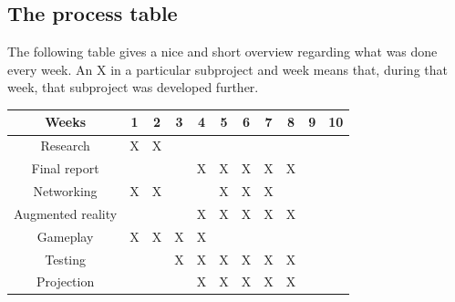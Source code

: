       
      \subsection{The process table} \label{ssec:processtable}
      The following table gives a nice and short overview regarding what was done
      every week. An X in a particular subproject and week means that, during that
      week, that subproject was developed further.\\
      \begin{table}[!ht]
	      \begin{tabular}{| c | c | c | c | c | c | c | c | c | c | c |}
	      	      \hline
	      	      Weeks & 1 & 2 & 3 & 4 & 5 & 6 & 7 & 8 & 9 & 10 \\
	      	      \hline
	      	      Research & X & X & \space & \space & \space & \space & \space & \space & \space & \space \\
	      	      \hline
	      	      Final report & \space & \space & \space & X & X & X & X & X & \space & \space \\
	      	      \hline
	      	      Networking & X & X & \space & \space & X & X & X & \space & \space & \space \\
	      	      \hline
	      	      Augmented reality & \space & \space & \space & X & X & X & X & X & \space & \space \\
	      	      \hline
	      	      Gameplay & X & X & X & X & \space & \space & \space & \space & \space & \space \\
	      	      \hline
	      	      Testing & \space & \space & X & X & X & X & X & X & \space & \space \\
	      	      \hline
	      	      Projection & \space & \space & \space & X & X & X & X & X & \space & \space \\
		      	  \hline
	      \end{tabular}
      \end{table}
